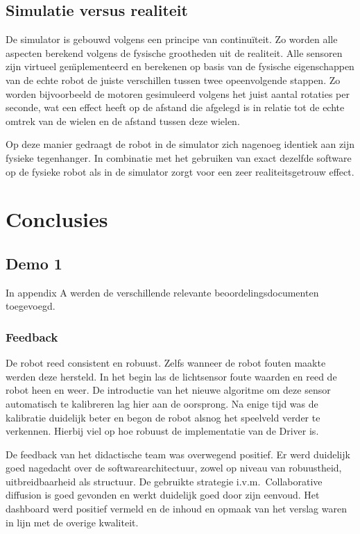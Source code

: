 \documentclass[12pt,a4paper]{report}
\begin{document}
\section{Simulatie versus realiteit}

De simulator is gebouwd volgens een principe van continu\"iteit. Zo worden alle aspecten berekend volgens de fysische grootheden uit de realiteit. Alle sensoren zijn virtueel ge\"mplementeerd en berekenen op basis van de fysische eigenschappen van de echte robot de juiste verschillen tussen twee opeenvolgende stappen. Zo worden bijvoorbeeld de motoren gesimuleerd volgens het juist aantal rotaties per seconde, wat een effect heeft op de afstand die afgelegd is in relatie tot de echte omtrek van de wielen en de afstand tussen deze wielen.

Op deze manier gedraagt de robot in de simulator zich nagenoeg identiek aan zijn fysieke tegenhanger. In combinatie met het gebruiken van exact dezelfde software op de fysieke robot als in de simulator zorgt voor een zeer realiteitsgetrouw effect.

\chapter{Conclusies}

\section{Demo 1}

In appendix A werden de verschillende relevante beoordelingsdocumenten toegevoegd.

\subsection{Feedback}

De robot reed consistent en robuust. Zelfs wanneer de robot fouten maakte werden deze hersteld. In het begin las de lichtsensor foute waarden en reed de robot heen en weer. De introductie van het nieuwe algoritme om deze sensor automatisch te kalibreren lag hier aan de oorsprong. Na enige tijd was de kalibratie duidelijk beter en begon de robot alsnog het speelveld verder te verkennen. Hierbij viel op hoe robuust de implementatie van de Driver is.

De feedback van het didactische team was overwegend positief. Er werd duidelijk goed nagedacht over de softwarearchitectuur, zowel op niveau van robuustheid, uitbreidbaarheid als structuur. De gebruikte strategie i.v.m.\ Collaborative diffusion is goed gevonden en werkt duidelijk goed door zijn eenvoud. Het dashboard werd positief vermeld en de inhoud en opmaak van het verslag waren in lijn met de overige kwaliteit.
\end{document}
